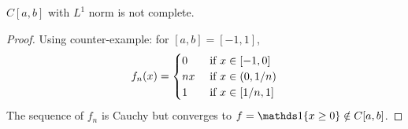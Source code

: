 \documentclass[11pt]{article}
\begin{document}
	\begin{example}
		$C[a, b]$ with $L^1$ norm is not complete.
		\begin{proof}
			Using counter-example: for $[a, b] = [-1, 1]$,
			\begin{align}
				f_n(x) = \begin{cases}
					0 &\text{{ if }} x \in [-1, 0] \\
					nx & \text{{ if }} x \in(0, 1/n) \\
					1 &\text{{ if }} x \in [1/n, 1] \\
				\end{cases}
			\end{align}
			The sequence of $f_n$ is Cauchy but converges to $f = \id{x \geq 0} \notin C[a,b]$.
		\end{proof}
	\end{example}
	
\end{document}
